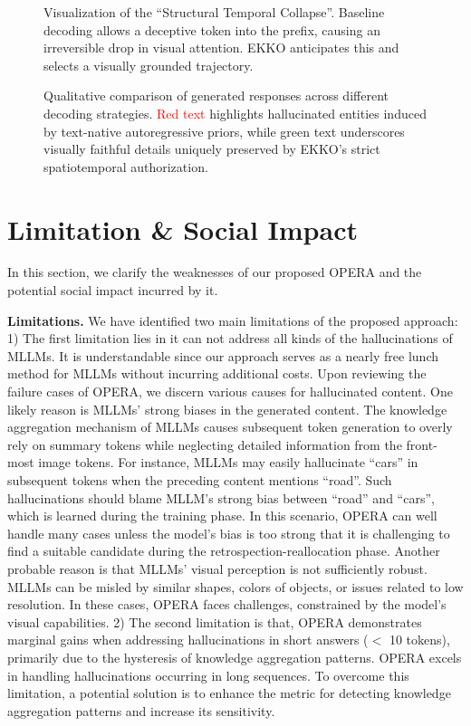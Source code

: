 \begin{figure}[t]
    \centering
    \vspace{4cm}
    \caption{Visualization of the ``Structural Temporal Collapse''. Baseline decoding allows a deceptive token into the prefix, causing an irreversible drop in visual attention. EKKO anticipates this and selects a visually grounded trajectory.}
    \label{fig:attention_traj}
\end{figure}

\begin{figure}[t]
    \centering
    \vspace{6cm}
    \caption{Qualitative comparison of generated responses across different decoding strategies. \textcolor{red}{Red text} highlights hallucinated entities induced by text-native autoregressive priors, while \textcolor{green!60!black}{green text} underscores visually faithful details uniquely preserved by EKKO's strict spatiotemporal authorization.}
    \label{fig:case_study}
\end{figure}

\section{Limitation \& Social Impact}
\label{sec:supp_1}

In this section, we clarify the weaknesses of our proposed OPERA and the potential social impact incurred by it. 

\noindent\textbf{Limitations.} 
We have identified two main limitations of the proposed approach: 
1) The first limitation lies in it can not address all kinds of the hallucinations of MLLMs. 
It is understandable since our approach serves as a nearly free lunch method for MLLMs without incurring additional costs.
Upon reviewing the failure cases of OPERA, we discern various causes for hallucinated content. 
One likely reason is MLLMs' strong biases in the generated content. 
The knowledge aggregation mechanism of MLLMs causes subsequent token generation to overly rely on summary tokens while neglecting detailed information from the front-most image tokens. 
For instance, MLLMs may easily hallucinate ``cars'' in subsequent tokens when the preceding content mentions ``road''. 
Such hallucinations should blame MLLM's strong bias between ``road'' and ``cars'', which is learned during the training phase. 
In this scenario, OPERA can well handle many cases unless the model's bias is too strong that it is challenging to find a suitable candidate during the retrospection-reallocation phase. 
Another probable reason is that MLLMs' visual perception is not sufficiently robust. MLLMs can be misled by similar shapes, colors of objects, or issues related to low resolution. In these cases, OPERA faces challenges, constrained by the model's visual capabilities.
2) The second limitation is that, OPERA demonstrates marginal gains when addressing hallucinations in short answers ($<$ 10 tokens), primarily due to the hysteresis of knowledge aggregation patterns. 
OPERA excels in handling hallucinations occurring in long sequences. To overcome this limitation, a potential solution is to enhance the metric for detecting knowledge aggregation patterns and increase its sensitivity.



